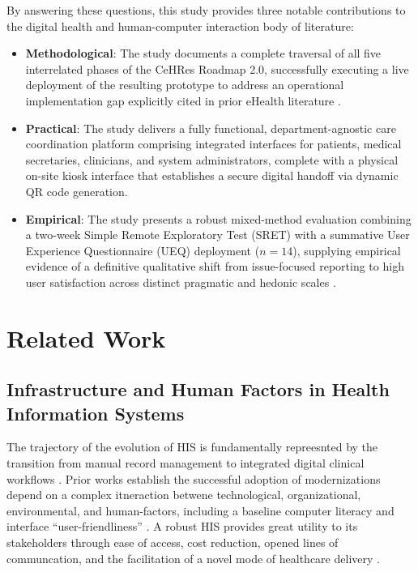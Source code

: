 \documentclass[manuscript, screen, review]{acmart}
\begin{document}
By answering these questions, this study provides three notable contributions to the digital health and human-computer interaction body of literature: 
\begin{itemize}
    \item \textbf{Methodological}: The study documents a complete traversal of all five interrelated phases of the CeHRes Roadmap 2.0, successfully executing a live deployment of the resulting prototype to address an operational implementation gap explicitly cited in prior eHealth literature \cite{ganjali_2024_ivrs}.
    \item \textbf{Practical}: The study delivers a fully functional, department-agnostic care coordination platform comprising integrated interfaces for patients, medical secretaries, clinicians, and system administrators, complete with a physical on-site kiosk interface that establishes a secure digital handoff via dynamic QR code generation.
    \item \textbf{Empirical}: The study presents a robust mixed-method evaluation combining a two-week Simple Remote Exploratory Test (SRET) with a summative User Experience Questionnaire (UEQ) deployment ($n=14$), supplying empirical evidence of a definitive qualitative shift from issue-focused reporting to high user satisfaction across distinct pragmatic and hedonic scales \cite{laugwitz_2008_construction, schrepp_2023_user}.
\end{itemize}

\section{Related Work}
\label{sec:related-work}

\subsection{Infrastructure and Human Factors in Health Information Systems}
\label{sub:infrastructure_human_factors}

The trajectory of the evolution of HIS is fundamentally repreesnted by the transition from manual record management to integrated digital clinical workflows \cite{epizitone_2023_a}. Prior works establish the successful adoption of modernizations depend on a complex itneraction betwene technological, organizational, environmental, and human-factors, including a baseline computer literacy and interface ``user-friendliness'' \cite{epizitone_2023_a}. A robust HIS provides great utility to its stakeholders through ease of access, cost reduction, opened lines of communcation, and the facilitation of a novel mode of healthcare delivery \cite{epizitone_2023_a}. 
\end{document}
